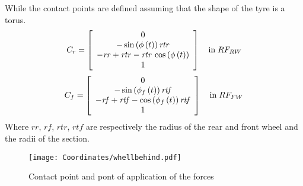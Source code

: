 %
While the contact points are defined assuming that the shape of the tyre is a torus. 
%
\begin{equation}
C_r =  \left[ \begin {array}{c} 0\\ 
-\sin \left( \phi
\left( t \right)  \right) {\it rtr}\\ 
-{\it rr}+{
\it rtr}-{\it rtr}\,\cos \left( \phi \left( t \right)  \right)\\ 
1\end {array} \right] 
\quad \text{in} \; RF_{RW}
\end{equation}
%
\begin{equation}
C_f =  \left[ \begin {array}{c} 0\\ 
-\sin \left( \phi_{f}
\left( t \right)  \right) {\it rtf}\\ 
-{\it rf}+{
\it rtf}-\cos \left( \phi_{f} \left( t \right)  \right) {\it rtf}\\
1\end {array} \right] 
\quad \text{in} \; RF_{FW}
\end{equation}
%
Where $rr$, $rf$, $rtr$, $rtf$ are respectively the radius of the rear and front wheel and the radii of the section.
%
\begin{figure}[!ht]
    \centering
    \texttt{[image: Coordinates/whellbehind.pdf]}
    \caption{Contact point and pont of application of the forces}
    \label{fig:PandC}
\end{figure}
%
